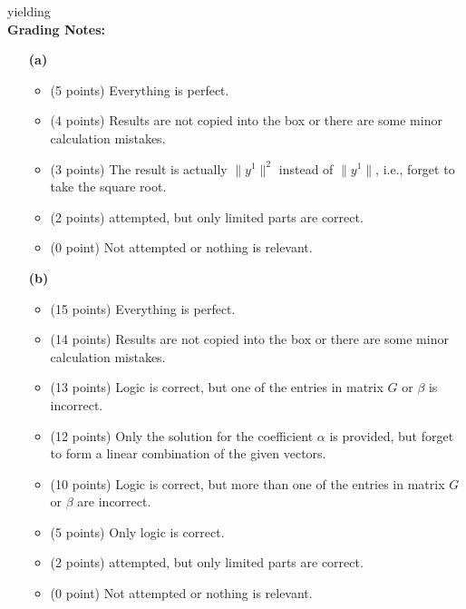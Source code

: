 \documentclass[letterpaper]{article}
\begin{document}
yielding\\


\noindent \textbf{Grading Notes:}
\begin{enumerate}
  \item[\bf (a)]
    \begin{itemize}
      \item (5 points) Everything is perfect.
      \item (4 points) Results are not copied into the box or there are some minor calculation mistakes.
      \item (3 points) The result is actually $\|y^{1}\|^{2}$ instead of $\|y^{1}\|$, i.e., forget to take the square root.
      \item (2 points) attempted, but only limited parts are correct.
      \item (0 point) Not attempted or nothing is relevant.
    \end{itemize}
  \item[\bf (b)]
    \begin{itemize}
      \item (15 points) Everything is perfect.
      \item (14 points) Results are not copied into the box or there are some minor calculation mistakes.
      \item (13 points) Logic is correct, but one of the entries in matrix $G$ or $\beta$ is incorrect.
      \item (12 points) Only the solution for the coefficient $\alpha$ is provided, but forget to form a linear combination of the given vectors.
      \item (10 points) Logic is correct, but more than one of the entries in matrix $G$ or $\beta$ are incorrect.
      \item (5 points) Only logic is correct.
      \item (2 points) attempted, but only limited parts are correct.
      \item (0 point) Not attempted or nothing is relevant.
    \end{itemize}
\end{enumerate}
\end{document}
